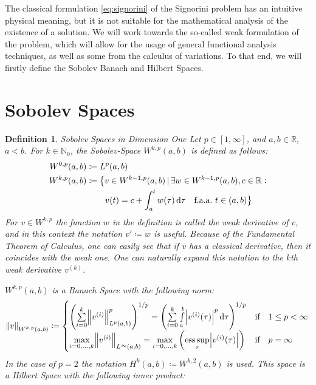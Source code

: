 \documentclass[headsepline,footsepline,footinclude=false,oneside,fontsize=11pt,paper=a4,listof=totoc,bibliography=totoc]{scrbook} %
\DeclareMathOperator*{\esssup}{ess\,sup}
\newtheorem{definition}{Definition}
\begin{document}
The classical formulation \eqref{eq:signorini} of the Signorini problem has an intuitive physical meaning, but it is not suitable for the mathematical analysis of the existence of a solution. We will work towards the so-called weak formulation of the problem, which will allow for the usage of general functional analysis techniques, as well as some from the calculus of variations. To that end, we will firstly define the Sobolev Banach and Hilbert Spaces.

\section{Sobolev Spaces}
\begin{definition}Sobolev Spaces in Dimension One\newline
	Let $p\in [1,\infty]$, and $a,b \in \mathbb{R}$, $a<b$. For $k \in \mathbb{N}_0$, the Sobolev-Space $W^{k,p}(a,b)$ is defined as follows:
	\begin{align}
	\begin{split}
	W^{0,p}(a,b) &\coloneqq L^p(a,b) \\
	W^{k,p}(a,b) &\coloneqq \big\{ v \in W^{k-1,p}(a,b) \,|\, \exists w \in W^{k-1,p}(a,b), c\in\mathbb{R}: \\
	& \phantom{\coloneqq \big\{\,\,} v(t) =  c + \int_a^t w(\tau) \dif \tau \quad \text{f.a.a.} \,\, t\in (a,b)  \big\}
	\end{split}
	\end{align}
	For $v\in W^{k,p}$ the function $w$ in the definition is called the weak derivative of $v$, and in this context the notation $v' \coloneqq w$ is useful. Because of the Fundamental Theorem of Calculus, one can easily see that if $v$ has a classical derivative, then it coincides with the weak one. One can naturally expand this notation to the $k$th weak derivative $v^{(k)}$.
	
	$W^{k,p}(a,b)$ is a Banach Space with the following norm:
	\begin{equation}
	\norm{v}_{W^{k,p}(a,b)} \coloneqq \begin{cases}
	\left(\sum\limits_{i = 0}^k \norm{v^{(i)}}_{L^p(a,b)}^p\right)^{1/p} = \left(\sum\limits_{i = 0}^k \int\limits_{a}^{b}{\abs{v^{(i)}(\tau)}^p \dif \tau}\right)^{1/p} &\text{if}\quad 1\leq p<\infty \\
	\max\limits_{i = 0,\dots,k} \norm{v^{(i)}}_{L^\infty(a,b)} = \max\limits_{i = 0,\dots,k} \left(\esssup\limits_\tau \abs{v^{(i)}(\tau)}\right) &\text{if}\quad p = \infty
	\end{cases} \label{eq:sobolev1_norm}
	\end{equation}
	In the case of $p=2$ the notation $H^k(a,b) \coloneqq W^{k,2}(a,b)$ is used. This space is a Hilbert Space with the following inner product:
	

\end{definition}
\end{document}
